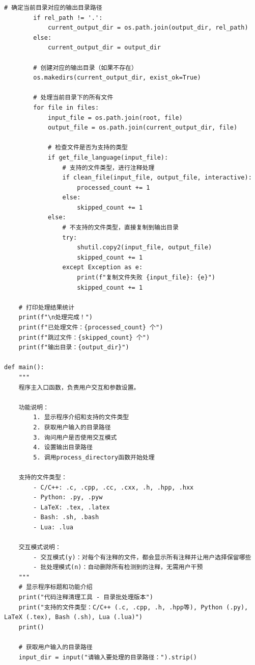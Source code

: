 \begin{lstlisting}[style=pythonstyle, title={递归删除整个文件夹中注释.py}]
        # 确定当前目录对应的输出目录路径
        if rel_path != '.':
            current_output_dir = os.path.join(output_dir, rel_path)
        else:
            current_output_dir = output_dir
        
        # 创建对应的输出目录（如果不存在）
        os.makedirs(current_output_dir, exist_ok=True)
        
        # 处理当前目录下的所有文件
        for file in files:
            input_file = os.path.join(root, file)
            output_file = os.path.join(current_output_dir, file)
            
            # 检查文件是否为支持的类型
            if get_file_language(input_file):
                # 支持的文件类型，进行注释处理
                if clean_file(input_file, output_file, interactive):
                    processed_count += 1
                else:
                    skipped_count += 1
            else:
                # 不支持的文件类型，直接复制到输出目录
                try:
                    shutil.copy2(input_file, output_file)
                    skipped_count += 1
                except Exception as e:
                    print(f"复制文件失败 {input_file}: {e}")
                    skipped_count += 1
    
    # 打印处理结果统计
    print(f"\n处理完成！")
    print(f"已处理文件：{processed_count} 个")
    print(f"跳过文件：{skipped_count} 个")
    print(f"输出目录：{output_dir}")

def main():
    """
    程序主入口函数，负责用户交互和参数设置。
    
    功能说明：
        1. 显示程序介绍和支持的文件类型
        2. 获取用户输入的目录路径
        3. 询问用户是否使用交互模式
        4. 设置输出目录路径
        5. 调用process_directory函数开始处理
        
    支持的文件类型：
        - C/C++: .c, .cpp, .cc, .cxx, .h, .hpp, .hxx
        - Python: .py, .pyw
        - LaTeX: .tex, .latex
        - Bash: .sh, .bash
        - Lua: .lua
        
    交互模式说明：
        - 交互模式(y)：对每个有注释的文件，都会显示所有注释并让用户选择保留哪些
        - 批处理模式(n)：自动删除所有检测到的注释，无需用户干预
    """
    # 显示程序标题和功能介绍
    print("代码注释清理工具 - 目录批处理版本")
    print("支持的文件类型：C/C++ (.c, .cpp, .h, .hpp等), Python (.py), LaTeX (.tex), Bash (.sh), Lua (.lua)")
    print()
    
    # 获取用户输入的目录路径
    input_dir = input("请输入要处理的目录路径：").strip()
    

\end{lstlisting}
